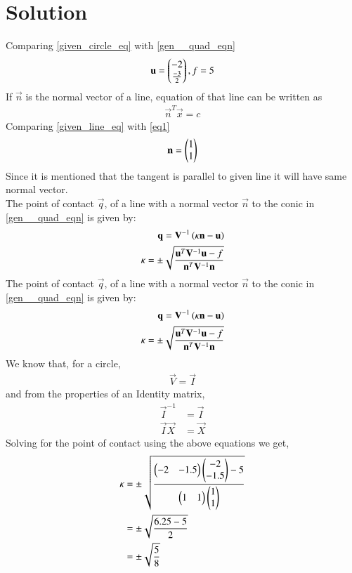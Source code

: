 \documentclass[journal,12pt,twocolumn]{IEEEtran}
\begin{document}
\section{Solution}

Comparing \eqref{given_circle_eq} with \eqref{gen__quad_eqn}
\begin{align}
\mathbf{u}=\begin{pmatrix}-2 \\ \frac{-3}{2}\end{pmatrix}, f=5
\end{align}
If $\vec{n}$ is the normal vector of a line, equation of that line can be written as 
\begin{align}
\vec{n}^T\vec{x} = c \label{eq1}
\end{align}
Comparing \eqref{given_line_eq} with \eqref{eq1}
\begin{align}
\mathbf{n} = \begin{pmatrix}1 \\ 1\end{pmatrix}\label{eq2}
\end{align}
Since it is mentioned that the tangent is parallel to given line it will have same normal vector. \\
 The point of contact $\vec{q}$, of a line with a normal vector $\vec{n}$ to the conic in \eqref{gen__quad_eqn} is given by:
\begin{align}
\mathbf{q} = \mathbf{V}^{-1}\left(\kappa \mathbf{n}-\mathbf{u}\right) \label{eq3} \\
\kappa = \pm \sqrt{\frac{\mathbf{u}^T\mathbf{V}^{-1}\mathbf{u}-f}{\mathbf{n}^T\mathbf{V}^{-1}\mathbf{n}}} \label{eq4}
\end{align}
The point of contact $\vec{q}$, of a line with a normal vector $\vec{n}$ to the conic in \eqref{gen__quad_eqn} is given by:
\begin{align}
\mathbf{q} = \mathbf{V}^{-1}\left(\kappa \mathbf{n}-\mathbf{u}\right) \label{eq3} \\
\kappa = \pm \sqrt{\frac{\mathbf{u}^T\mathbf{V}^{-1}\mathbf{u}-f}{\mathbf{n}^T\mathbf{V}^{-1}\mathbf{n}}} \label{eq4}
\end{align}
We know that, for a circle, 
\begin{align}
\vec{V} = \vec{I}  
\end{align}
and from the properties of an Identity matrix, 
\begin{align}
\vec{I}^{-1} &= \vec{I} \\
\vec{I}\vec{X} &= \vec{X}   
\end{align}
Solving for the point of contact using the above equations we get,
\begin{align}
\kappa &= \pm \sqrt{\frac{\begin{pmatrix} -2 & -1.5 \end{pmatrix}\begin{pmatrix}-2 \\ -1.5\end{pmatrix} - 5}{\begin{pmatrix}1 & 1 \end{pmatrix}\begin{pmatrix}1 \\ 1 \end{pmatrix}}} \\
&= \pm \sqrt{\frac{6.25 - 5}{2}} \\
& =  \pm \sqrt{\frac{5}{8}}\\
\end{align}
\end{document}

